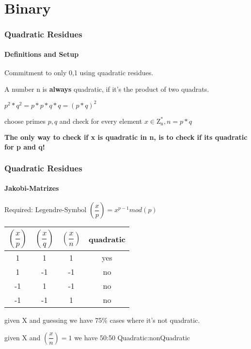 \section{Binary}

\begin{frame}
	\frametitle{Quadratic Residues}
	\framesubtitle{Definitions and Setup}
	Commitment to only {0,1} using quadratic residues. ~\newline
	
	A number n is \textbf{always} quadratic, if it's the product of two quadrats. ~\newline
	\begin{center}
		$p^2 * q ^2 = p * p * q * q = (p*q)^2$ 
	\end{center}

	choose primes $p,q$ and check for every element $x \in \mathrm{Z_n^*} , n=p*q$ ~\newline ~\newline
	
	\textbf{The only way to check if x is quadratic in n, is to check if its quadratic for p and q!}
\end{frame}

\begin{frame}
	\frametitle{Quadratic Residues}
	\framesubtitle{Jakobi-Matrizes}
	Required: Legendre-Symbol $(\dfrac{x}{p}) = x^{p-1} mod(p)$ ~\newline
	\begin{center}
			\begin{tabular}{|c|c|c|c|}
			\hline 
			$(\dfrac{x}{p})$&$(\dfrac{x}{q})$ &$(\dfrac{x}{n})$& quadratic \\ 
			\hline 
			1 & 1  & 1  & yes \\ 
			\hline 
			1 & -1  & -1  & no \\ 
			\hline 	
			-1 & 1  & -1  & no \\ 
			\hline 	
			-1 & -1  & 1  & no \\ 
			\hline 
		\end{tabular} 
	\end{center}

	given X and guessing we have 75\% cases where it's not quadratic. 
	
	given X and $(\dfrac{x}{n})=1$ we have 50:50 Quadratic:nonQuadratic 
\end{frame}

